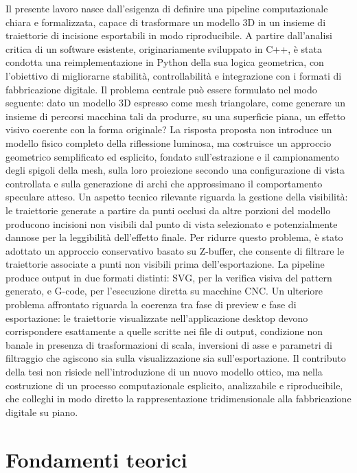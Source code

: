 \documentclass[a4paper,11pt,titlepage,twoside]{book}
\newcommand{\1}{\mathbf{1}}
\numberwithin{equation}{chapter}
\theoremstyle{plain}
\theoremstyle{definition}
\begin{document}
	Il presente lavoro nasce dall'esigenza di definire una pipeline
	computazionale chiara e formalizzata, capace di trasformare un modello 3D
	in un insieme di traiettorie di incisione esportabili in modo riproducibile.
	A partire dall'analisi critica di un software esistente, originariamente
	sviluppato in C++, è stata condotta una reimplementazione in Python della
	sua logica geometrica, con l'obiettivo di migliorarne stabilità,
	controllabilità e integrazione con i formati di fabbricazione digitale.
	Il problema centrale può essere formulato nel modo seguente: dato un modello
	3D espresso come mesh triangolare, come generare un insieme di percorsi
	macchina tali da produrre, su una superficie piana, un effetto visivo
	coerente con la forma originale?
	La risposta proposta non introduce un modello fisico completo della
	riflessione luminosa, ma costruisce un approccio geometrico semplificato
	ed esplicito, fondato sull'estrazione e il campionamento degli spigoli della
	mesh, sulla loro proiezione secondo una configurazione di vista controllata
	e sulla generazione di archi che approssimano il comportamento speculare
	atteso. Un aspetto tecnico rilevante riguarda la gestione della visibilità:
	le traiettorie generate a partire da punti occlusi da altre porzioni del
	modello producono incisioni non visibili dal punto di vista selezionato e
	potenzialmente dannose per la leggibilità dell'effetto finale. Per ridurre
	questo problema, è stato adottato un approccio conservativo basato su
	Z-buffer, che consente di filtrare le traiettorie associate a punti non
	visibili prima dell'esportazione. La pipeline produce output in due formati
	distinti: SVG, per la verifica visiva del pattern generato, e G-code, per
	l'esecuzione diretta su macchine CNC. Un ulteriore problema affrontato
	riguarda la coerenza tra fase di preview e fase di esportazione: le
	traiettorie visualizzate nell'applicazione desktop devono corrispondere
	esattamente a quelle scritte nei file di output, condizione non banale in
	presenza di trasformazioni di scala, inversioni di asse e parametri di
	filtraggio che agiscono sia sulla visualizzazione sia sull'esportazione.
	Il contributo della tesi non risiede nell'introduzione di un nuovo modello
	ottico, ma nella costruzione di un processo computazionale esplicito,
	analizzabile e riproducibile, che colleghi in modo diretto la
	rappresentazione tridimensionale alla fabbricazione digitale su piano.
	
	\chapter{Fondamenti teorici}
	
\end{document}
